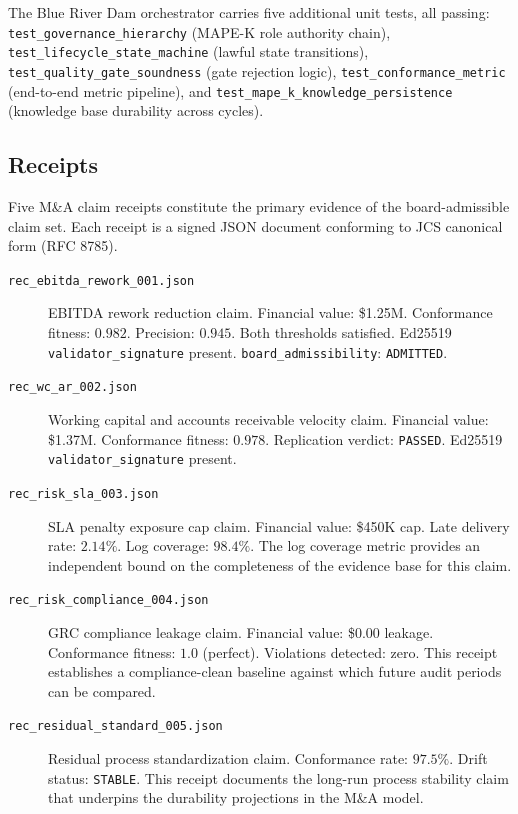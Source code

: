 The Blue River Dam orchestrator carries five additional unit tests, all passing:
\texttt{test\_governance\_hierarchy} (MAPE-K role authority chain),
\texttt{test\_lifecycle\_state\_machine} (lawful state transitions),
\texttt{test\_quality\_gate\_soundness} (gate rejection logic),
\texttt{test\_conformance\_metric} (end-to-end metric pipeline), and
\texttt{test\_mape\_k\_knowledge\_persistence} (knowledge base durability across cycles).

\subsection{Receipts}
\label{sec:receipts-evidence-receipts}

Five M\&A claim receipts constitute the primary evidence of the board-admissible claim set.
Each receipt is a signed JSON document conforming to JCS canonical form (RFC 8785).

\begin{description}
  \item[\texttt{rec\_ebitda\_rework\_001.json}] EBITDA rework reduction claim. Financial
    value: \$1.25M. Conformance fitness: $0.982$. Precision: $0.945$. Both thresholds
    satisfied. Ed25519 \texttt{validator\_signature} present.
    \texttt{board\_admissibility}: \texttt{ADMITTED}.
  \item[\texttt{rec\_wc\_ar\_002.json}] Working capital and accounts receivable velocity
    claim. Financial value: \$1.37M. Conformance fitness: $0.978$. Replication verdict:
    \texttt{PASSED}. Ed25519 \texttt{validator\_signature} present.
  \item[\texttt{rec\_risk\_sla\_003.json}] SLA penalty exposure cap claim. Financial
    value: \$450K cap. Late delivery rate: $2.14\%$. Log coverage: $98.4\%$. The
    log coverage metric provides an independent bound on the completeness of the
    evidence base for this claim.
  \item[\texttt{rec\_risk\_compliance\_004.json}] GRC compliance leakage claim.
    Financial value: \$0.00 leakage. Conformance fitness: $1.0$ (perfect). Violations
    detected: zero. This receipt establishes a compliance-clean baseline against which
    future audit periods can be compared.
  \item[\texttt{rec\_residual\_standard\_005.json}] Residual process standardization
    claim. Conformance rate: $97.5\%$. Drift status: \texttt{STABLE}. This receipt
    documents the long-run process stability claim that underpins the durability
    projections in the M\&A model.
\end{description}

